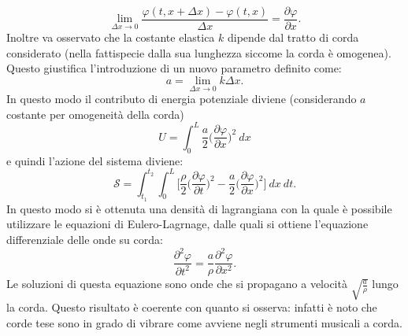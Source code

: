 \begin{equation*}
    \lim_{\Delta x\rightarrow 0}\frac{\varphi(t,x+\Delta x)-\varphi(t,x)}{\Delta x}=\frac{\partial \varphi}{\partial x}.
\end{equation*}
Inoltre va osservato che la costante elastica $k$ dipende dal tratto di corda considerato (nella fattispecie dalla sua lunghezza siccome la corda è omogenea). Questo giustifica l'introduzione di un nuovo parametro definito come:
\begin{equation*}
    a=\lim_{\Delta x\rightarrow 0}k\Delta x.
\end{equation*}
In questo modo il contributo di energia potenziale diviene (considerando $a$ costante per omogeneità della corda)
\begin{equation*}
    U=\int_{0}^{L} \frac{a}{2}\bigg(\frac{\partial \varphi}{\partial x}\bigg)^2\ dx
\end{equation*}
e quindi l'azione del sistema diviene:
\begin{equation}
    \mathcal{S} =\int_{t_1}^{t_2}\int_{0}^{L}\bigg[ \frac{\rho}{2}\bigg(\frac{\partial \varphi}{\partial t}\bigg)^2-\frac{a}{2}\bigg(\frac{\partial \varphi}{\partial x}\bigg)^2\bigg]\ dx\ dt.
\end{equation}
In questo modo si è ottenuta una densità di lagrangiana con la quale è possibile utilizzare le equazioni di Eulero-Lagrnage, dalle quali si ottiene l'equazione differenziale delle onde su corda:
\begin{equation*}
    \frac{\partial^2 \varphi}{\partial t^2}=\frac{a}{\rho}\frac{\partial^2 \varphi}{\partial x^2}.
\end{equation*}
Le soluzioni di questa equazione sono onde che si propagano a velocità $\sqrt{\frac{a}{\rho}}$ lungo la corda. Questo risultato è coerente con quanto si osserva: infatti è noto che corde tese sono in grado di vibrare come avviene negli strumenti musicali a corda.